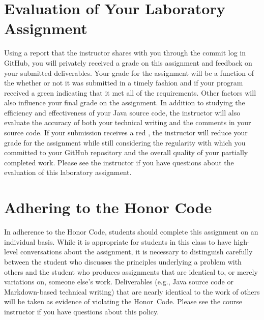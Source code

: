 \documentclass[11pt]{article}
\newcommand{\checkmark}{\ding{51}}
\newcommand{\naughtmark}{\ding{55}}
\begin{document}
\section*{Evaluation of Your Laboratory Assignment}

Using a report that the instructor shares with you through the commit log in
GitHub, you will privately received a grade on this assignment and feedback on
your submitted deliverables. Your grade for the assignment will be a function
of the whether or not it was submitted in a timely fashion and if your program
received a green \checkmark{} indicating that it met all of the requirements.
Other factors will also influence your final grade on the assignment. In
addition to studying the efficiency and effectiveness of your Java source code,
the instructor will also evaluate the accuracy of both your technical writing
and the comments in your source code. If your submission receives a red
\naughtmark{}, the instructor will reduce your grade for the assignment while
still considering the regularity with which you committed to your GitHub
repository and the overall quality of your partially completed work. Please see
the instructor if you have questions about the evaluation of this laboratory
assignment.

\section*{Adhering to the Honor Code}

In adherence to the Honor Code, students should complete this assignment on an
individual basis. While it is appropriate for students in this class to have
high-level conversations about the assignment, it is necessary to distinguish
carefully between the student who discusses the principles underlying a problem
with others and the student who produces assignments that are identical to, or
merely variations on, someone else's work. Deliverables (e.g., Java source code
or Markdown-based technical writing) that are nearly identical to the work of
others will be taken as evidence of violating the \mbox{Honor Code}. Please see
the course instructor if you have questions about this policy.
\end{document}
